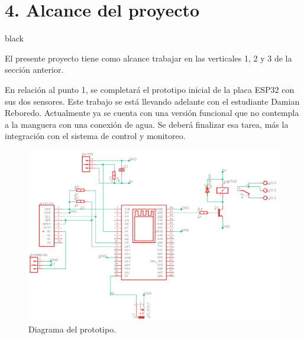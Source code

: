 \documentclass[
11pt, %
codirector, %
]{charter}
\begin{document}
\section{4. Alcance del proyecto}
\label{sec:alcance}

\begin{consigna}{black}

El presente proyecto tiene como alcance trabajar en las verticales 1, 2 y 3 de la sección anterior.

En relación al punto 1, se completará el prototipo inicial de la placa ESP32 con sus dos sensores. Este trabajo se está llevando adelante con el estudiante Damian Reboredo. Actualmente ya se cuenta con una versión funcional que no contempla a la manguera con una conexión de agua. Se deberá finalizar esa tarea, más la integración con el sistema de control y monitoreo.


\begin{figure}[htpb]
\centering 
\includegraphics[width=.7\textwidth]{./Figuras/diagDipos.png}
\caption{Diagrama del prototipo.}
\label{fig:diagDipos}
\end{figure}

\vspace{25px}

\end{consigna}
\end{document}
